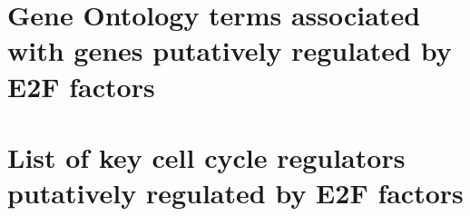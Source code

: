 \documentclass[11pt,twoside,a4paper]{report}
\begin{document}
\cleardoublepage
\begin{appendices}
	\chapter{Gene Ontology terms associated with genes putatively regulated by E2F factors}
	\label{appendix:GOterms}
	
	\chapter{List of key cell cycle regulators putatively regulated by E2F factors}	
	\label{list_key_cell_cycle_regulators}

\end{appendices}
\end{document}

